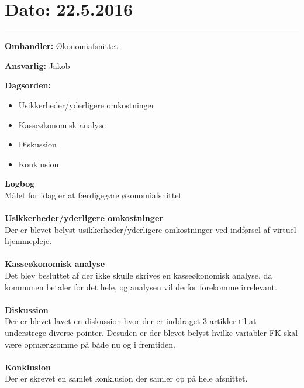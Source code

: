 \section{Dato: 22.5.2016}
\hrule

\textbf{Omhandler:} Økonomiafsnittet

\textbf{Ansvarlig:} Jakob

\textbf{Dagsorden:}
\begin{itemize}
	\item Usikkerheder/yderligere omkostninger
	\item Kasseøkonomisk analyse
	\item Diskussion
	\item Konklusion
\end{itemize}

\textbf{Logbog}
\\
Målet for idag er at færdigegøre økonomiafsnittet
\\ \\

\textbf{Usikkerheder/yderligere omkostninger}
\\
Der er blevet belyst usikkerheder/yderligere omkostninger ved indførsel af virtuel hjemmepleje.
\\ \\

\textbf{Kasseøkonomisk analyse}
\\
Det blev besluttet af der ikke skulle skrives en kasseøkonomisk analyse, da kommunen betaler for det hele, og analysen vil derfor forekomme irrelevant. 
\\ \\

\textbf{Diskussion}
\\
Der er blevet lavet en diskussion hvor der er inddraget 3 artikler til at understrege diverse pointer. Desuden er der blevet belyst hvilke variabler FK skal være opmærksomme på både nu og i fremtiden. 
\\ \\

\textbf{Konklusion}
\\
Der er skrevet en samlet konklusion der samler op på hele afsnittet.
\\ \\




